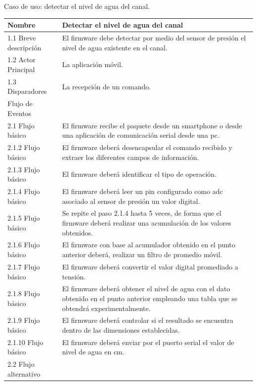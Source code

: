 Caso de uso: detectar el nivel de agua del canal.
\begin{table}[t]
\begin{center}
\begin{tabular}{ | m{4cm} | m{9cm} | }
\hline Nombre & Detectar el nivel de agua del canal \\ \hline
1.1 Breve descripción & 
El firmware debe detectar por medio del sensor de presión el nivel de agua existente en el canal. \\ \hline

 1.2 Actor Principal&La aplicación móvil.\\ \hline


 1.3 Disparadores & La recepción de un comando. \\ \hline

Flujo de Eventos& \\ \hline

 2.1 Flujo básico &
El firmware recibe el paquete desde un smartphone  o desde una aplicación de comunicación serial desde una pc. \\ \hline


 2.1.2 Flujo básico &
El firmware deberá desencapsular el comando recibido y extraer los diferentes campos de información. \\ \hline

 2.1.3 Flujo básico &
El firmware deberá identificar el tipo de operación. \\ \hline


 2.1.4 Flujo básico &
El firmware deberá leer un pin configurado como adc asociado al sensor de presión un valor digital. \\ \hline
 

2.1.5 Flujo básico &
Se repite el paso 2.1.4 hasta 5 veces, de forma que el firmware deberá realizar una acumulación de los valores obtenidos. \\ \hline


2.1.6 Flujo básico &
 El firmware con base al acumulador obtenido en el punto anterior deberá, realizar un filtro de promedio móvil.  \\ \hline
 
2.1.7 Flujo básico &
El firmware deberá convertir el valor digital promediado a tensión. \\ \hline 
2.1.8 Flujo básico &
El firmware deberá obtener el nivel de agua con el dato obtenido en el punto anterior empleando una tabla que se obtendrá experimentalmente. \\ \hline
2.1.9 Flujo básico &
El firmware deberá controlar si el resultado se encuentra dentro de las dimensiones establecidas. \\ \hline
2.1.10 Flujo básico &
El firmware deberá enviar por el puerto serial el valor de nivel de agua en cm. \\ \hline
2.2 Flujo alternativo &  \\ \hline



\end{tabular}
\end{center}
\end{table}
